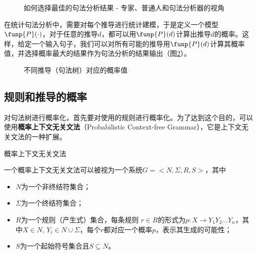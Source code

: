 \begin{figure}[htp]
    \centering

	\caption{如何选择最佳的句法分析结果 - 专家、普通人和句法分析器的视角}
    \label{fig:3.4-5}
\end{figure}

\parinterval 在统计句法分析中，需要对每个推导进行统计建模，于是定义一个模型$\funp{P}( \cdot )$，对于任意的推导$d$，都可以用$\funp{P}(d)$计算出推导$d$的概率。这样，给定一个输入句子，我们可以对所有可能的推导用$\funp{P}(d)$计算其概率值，并选择概率最大的结果作为句法分析的结果输出（图\ref{fig:3.4-6}）。

\begin{figure}[htp]
    \centering

	\caption{不同推导（句法树）对应的概率值}
    \label{fig:3.4-6}
\end{figure}


\subsection{规则和推导的概率}

\parinterval 对句法树进行概率化，首先要对使用的规则进行概率化。为了达到这个目的，可以使用{\small\sffamily\bfseries{概率上下文无关文法}}（Probabilistic Context-free Grammar），它是上下文无关文法的一种扩展。

\vspace{0.5em}
\begin{definition} 概率上下文无关文法

一个概率上下文无关文法可以被视为一个系统$G=<N,\varSigma,R,S>$，其中
\begin{itemize}
\vspace{0.5em}
\item $N$为一个非终结符集合；
\vspace{0.5em}
\item $\varSigma$为一个终结符集合；
\vspace{0.5em}
\item $R$为一个规则（产生式）集合，每条规则 $r \in R$的形式为$p:X \to Y_1Y_2...Y_n$，其中$X \in N$, $Y_i \in N \cup \varSigma$，每个$r$都对应一个概率$p$，表示其生成的可能性；
\vspace{0.5em}
\item $S$为一个起始符号集合且$S \subseteq N$。
\vspace{0.5em}
\end{itemize}
\end{definition}


